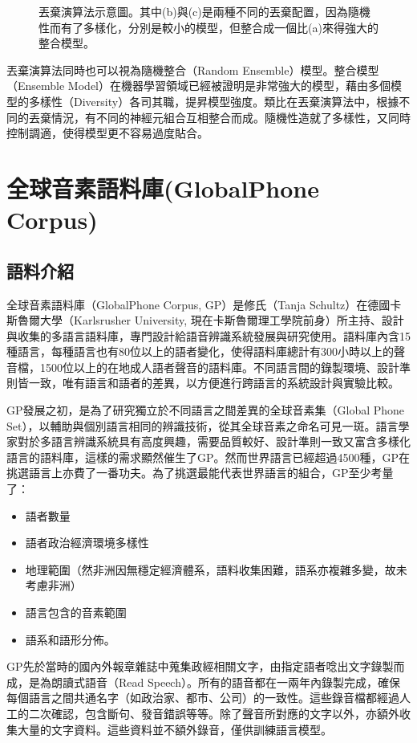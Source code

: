 \begin{figure}
\caption{丟棄演算法示意圖。其中(b)與(c)是兩種不同的丟棄配置，因為隨機性而有了多樣化，分別是較小的模型，但整合成一個比(a)來得強大的整合模型。}
\end{figure}

丟棄演算法同時也可以視為隨機整合（Random Ensemble）模型。整合模型（Ensemble Model）在機器學習領域已經被證明是非常強大的模型，藉由多個模型的多樣性（Diversity）各司其職，提昇模型強度。類比在丟棄演算法中，根據不同的丟棄情況，有不同的神經元組合互相整合而成。隨機性造就了多樣性，又同時控制調適，使得模型更不容易過度貼合。
\section{全球音素語料庫(GlobalPhone Corpus)}
\subsection{語料介紹}
全球音素語料庫（GlobalPhone Corpus, GP）是修氏（Tanja Schultz）在德國卡斯魯爾大學（Karlsrusher University, 現在卡斯魯爾理工學院前身）所主持、設計與收集的多語言語料庫\cite{schultz2013globalphone}，專門設計給語音辨識系統發展與研究使用。語料庫內含15種語言，每種語言也有80位以上的語者變化，使得語料庫總計有300小時以上的聲音檔，1500位以上的在地成人語者聲音的語料庫。不同語言間的錄製環境、設計準則皆一致，唯有語言和語者的差異，以方便進行跨語言的系統設計與實驗比較。

GP發展之初，是為了研究獨立於不同語言之間差異的全球音素集（Global Phone Set），以輔助與個別語言相同的辨識技術，從其全球音素之命名可見一斑。語言學家對於多語言辨識系統具有高度興趣，需要品質較好、設計準則一致又富含多樣化語言的語料庫，這樣的需求顯然催生了GP。然而世界語言已經超過4500種，GP在挑選語言上亦費了一番功夫。為了挑選最能代表世界語言的組合，GP至少考量了：
\begin{itemize}
\itemsep -2pt 
 \item 語者數量
 \item 語者政治經濟環境多樣性
 \item 地理範圍（然非洲因無穩定經濟體系，語料收集困難，語系亦複雜多變，故未考慮非洲）
 \item 語言包含的音素範圍
 \item 語系和語形分佈。
\end{itemize}
GP先於當時的國內外報章雜誌中蒐集政經相關文字，由指定語者唸出文字錄製而成，是為朗讀式語音（Read Speech）。所有的語音都在一兩年內錄製完成，確保每個語言之間共通名字（如政治家、都市、公司）的一致性。這些錄音檔都經過人工的二次確認，包含斷句、發音錯誤等等。除了聲音所對應的文字以外，亦額外收集大量的文字資料。這些資料並不額外錄音，僅供訓練語言模型。


